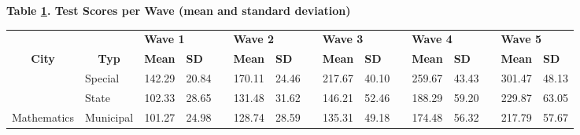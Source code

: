 \documentclass[a4paper, 12pt]{article}
\begin{document}
\begin{table}[H]
  \centering
            \label{table:AverageGrade}                        \centering            \textbf{Table \ref{table:AverageGrade}. Test Scores per Wave (mean and standard deviation)} \\ 
  \begin{adjustbox}{width=1\textwidth}
    \begin{tabular}{llllllllllllllll}
    \toprule
          &       & \multicolumn{2}{p{6.055em}}{\textbf{\hspace{12pt} Wave 1 }} &       & \multicolumn{2}{p{6.055em}}{\textbf{\hspace{12pt} Wave 2 }} &       & \multicolumn{2}{p{6.055em}}{\textbf{\hspace{12pt} Wave 3 }} &       & \multicolumn{2}{p{6.055em}}{\textbf{\hspace{12pt} Wave 4 }} &       & \multicolumn{2}{p{6.055em}}{\textbf{\hspace{12pt} Wave 5 }} \\
\cmidrule{3-4}\cmidrule{6-7}\cmidrule{9-10}\cmidrule{12-13}\cmidrule{15-16}    \multicolumn{1}{c}{\textbf{City}} & \multicolumn{1}{c}{\textbf{Typ}} & \multicolumn{1}{p{3.445em}}{\textbf{ Mean }} & \multicolumn{1}{p{2.61em}}{\textbf{ SD }} &       & \multicolumn{1}{p{3.445em}}{\textbf{ Mean }} & \multicolumn{1}{p{2.61em}}{\textbf{ SD }} &       & \multicolumn{1}{p{3.445em}}{\textbf{ Mean }} & \multicolumn{1}{p{2.61em}}{\textbf{ SD }} &       & \multicolumn{1}{p{3.445em}}{\textbf{ Mean }} & \multicolumn{1}{p{2.61em}}{\textbf{ SD }} &       & \multicolumn{1}{p{3.445em}}{\textbf{ Mean }} & \multicolumn{1}{p{2.61em}}{\textbf{ SD }} \\
    \midrule
          & Special & \multicolumn{1}{c}{142.29} & \multicolumn{1}{c}{20.84} &       & \multicolumn{1}{c}{170.11} & \multicolumn{1}{c}{24.46} &       & \multicolumn{1}{c}{217.67} & \multicolumn{1}{c}{40.10} &       & \multicolumn{1}{c}{259.67} & \multicolumn{1}{c}{43.43} &       & \multicolumn{1}{c}{301.47} & \multicolumn{1}{c}{48.13} \\
          & State & \multicolumn{1}{c}{102.33} & \multicolumn{1}{c}{28.65} &       & \multicolumn{1}{c}{131.48} & \multicolumn{1}{c}{31.62} &       & \multicolumn{1}{c}{146.21} & \multicolumn{1}{c}{52.46} &       & \multicolumn{1}{c}{188.29} & \multicolumn{1}{c}{59.20} &       & \multicolumn{1}{c}{229.87} & \multicolumn{1}{c}{63.05} \\
    Mathematics & Municipal & \multicolumn{1}{c}{101.27} & \multicolumn{1}{c}{24.98} &       & \multicolumn{1}{c}{128.74} & \multicolumn{1}{c}{28.59} &       & \multicolumn{1}{c}{135.31} & \multicolumn{1}{c}{49.18} &       & \multicolumn{1}{c}{174.48} & \multicolumn{1}{c}{56.32} &       & \multicolumn{1}{c}{217.79} & \multicolumn{1}{c}{57.67} \\

\end{tabular}
\end{adjustbox}
\end{table}
\end{document}
